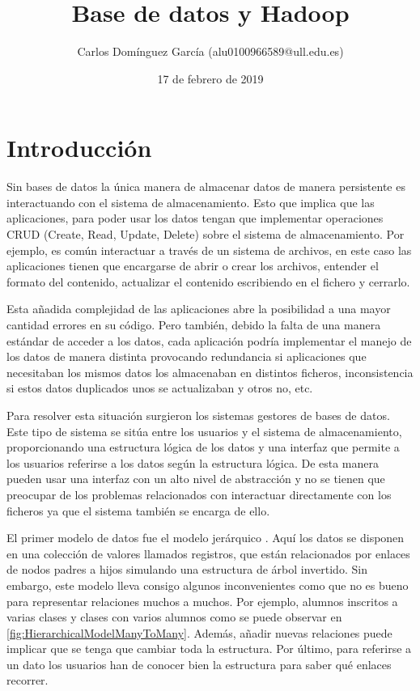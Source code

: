 \documentclass[12pt]{article}
\title{Base de datos y Hadoop}
\author{Carlos Domínguez García (alu0100966589@ull.edu.es)}
\date{17 de febrero de 2019}
\begin{document}
  \maketitle
  \pagebreak
  
  \tableofcontents
  \pagebreak

  \section{Introducción}
    Sin bases de datos la única manera de almacenar datos de manera persistente es interactuando con el sistema de almacenamiento. Esto que implica que las aplicaciones, para poder usar los datos tengan que implementar operaciones CRUD (Create, Read, Update, Delete) sobre el sistema de almacenamiento. Por ejemplo, es común interactuar a través de un sistema de archivos, en este caso las aplicaciones tienen que encargarse de abrir o crear los archivos, entender el formato del contenido, actualizar el contenido escribiendo en el fichero y cerrarlo.

    Esta añadida complejidad de las aplicaciones abre la posibilidad a una mayor cantidad errores en su código. Pero también, debido la falta de una manera estándar de acceder a los datos, cada aplicación podría implementar el manejo de los datos de manera distinta provocando redundancia si aplicaciones que necesitaban los mismos datos los almacenaban en distintos ficheros, inconsistencia si estos datos duplicados unos se actualizaban y otros no, etc. \cite{MariaDB_EarlyDatabaseModels}

    Para resolver esta situación surgieron los sistemas gestores de bases de datos. Este tipo de sistema se sitúa entre los usuarios y el sistema de almacenamiento, proporcionando una estructura lógica de los datos y una interfaz que permite a los usuarios referirse a los datos según la estructura lógica. De esta manera pueden usar una interfaz con un alto nivel de abstracción y no se tienen que preocupar de los problemas relacionados con interactuar directamente con los ficheros ya que el sistema también se encarga de ello.
    
    El primer modelo de datos fue el modelo jerárquico \cite{MariaDB_HierarchicalDatabaseModel}. Aquí los datos se disponen en una colección de valores llamados registros, que están relacionados por enlaces de nodos padres a hijos simulando una estructura de árbol invertido. Sin embargo, este modelo lleva consigo algunos inconvenientes como que no es bueno para representar relaciones muchos a muchos. Por ejemplo, alumnos inscritos a varias clases y clases con varios alumnos como se puede observar en \cref{fig:HierarchicalModelManyToMany}. Además, añadir nuevas relaciones puede implicar que se tenga que cambiar toda la estructura. Por último, para referirse a un dato los usuarios han de conocer bien la estructura para saber qué enlaces recorrer.
\end{document}
